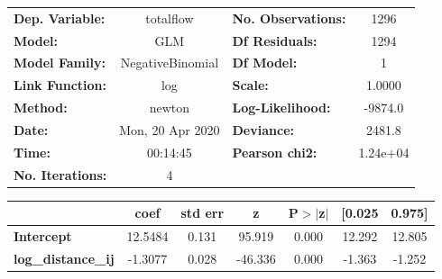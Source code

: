 \begin{center}
\begin{tabular}{lclc}
\toprule
\textbf{Dep. Variable:}    &    totalflow     & \textbf{  No. Observations:  } &     1296    \\
\textbf{Model:}            &       GLM        & \textbf{  Df Residuals:      } &     1294    \\
\textbf{Model Family:}     & NegativeBinomial & \textbf{  Df Model:          } &        1    \\
\textbf{Link Function:}    &       log        & \textbf{  Scale:             } &    1.0000   \\
\textbf{Method:}           &      newton      & \textbf{  Log-Likelihood:    } &   -9874.0   \\
\textbf{Date:}             & Mon, 20 Apr 2020 & \textbf{  Deviance:          } &    2481.8   \\
\textbf{Time:}             &     00:14:45     & \textbf{  Pearson chi2:      } &  1.24e+04   \\
\textbf{No. Iterations:}   &        4         & \textbf{                     } &             \\
\bottomrule
\end{tabular}
\begin{tabular}{lcccccc}
                           & \textbf{coef} & \textbf{std err} & \textbf{z} & \textbf{P$> |$z$|$} & \textbf{[0.025} & \textbf{0.975]}  \\
\midrule
\textbf{Intercept}         &      12.5484  &        0.131     &    95.919  &         0.000        &       12.292    &       12.805     \\
\textbf{log\_distance\_ij} &      -1.3077  &        0.028     &   -46.336  &         0.000        &       -1.363    &       -1.252     \\
\bottomrule
\end{tabular}
\end{center}